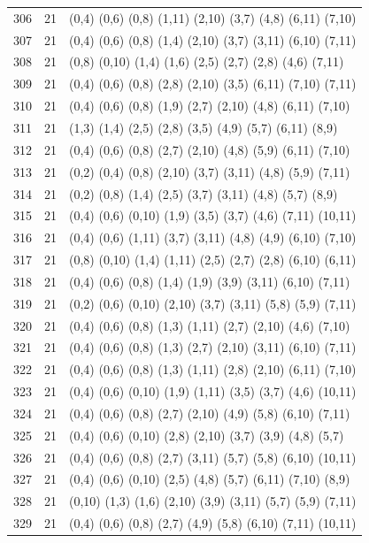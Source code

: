 {\begin{longtable}{lll}
306 & 21 & (0,4) (0,6) (0,8) (1,11) (2,10) (3,7) (4,8) (6,11) (7,10) \\
307 & 21 & (0,4) (0,6) (0,8) (1,4) (2,10) (3,7) (3,11) (6,10) (7,11) \\
308 & 21 & (0,8) (0,10) (1,4) (1,6) (2,5) (2,7) (2,8) (4,6) (7,11) \\
309 & 21 & (0,4) (0,6) (0,8) (2,8) (2,10) (3,5) (6,11) (7,10) (7,11) \\
310 & 21 & (0,4) (0,6) (0,8) (1,9) (2,7) (2,10) (4,8) (6,11) (7,10) \\
311 & 21 & (1,3) (1,4) (2,5) (2,8) (3,5) (4,9) (5,7) (6,11) (8,9) \\
312 & 21 & (0,4) (0,6) (0,8) (2,7) (2,10) (4,8) (5,9) (6,11) (7,10) \\
313 & 21 & (0,2) (0,4) (0,8) (2,10) (3,7) (3,11) (4,8) (5,9) (7,11) \\
314 & 21 & (0,2) (0,8) (1,4) (2,5) (3,7) (3,11) (4,8) (5,7) (8,9) \\
315 & 21 & (0,4) (0,6) (0,10) (1,9) (3,5) (3,7) (4,6) (7,11) (10,11) \\
316 & 21 & (0,4) (0,6) (1,11) (3,7) (3,11) (4,8) (4,9) (6,10) (7,10) \\
317 & 21 & (0,8) (0,10) (1,4) (1,11) (2,5) (2,7) (2,8) (6,10) (6,11) \\
318 & 21 & (0,4) (0,6) (0,8) (1,4) (1,9) (3,9) (3,11) (6,10) (7,11) \\
319 & 21 & (0,2) (0,6) (0,10) (2,10) (3,7) (3,11) (5,8) (5,9) (7,11) \\
320 & 21 & (0,4) (0,6) (0,8) (1,3) (1,11) (2,7) (2,10) (4,6) (7,10) \\
321 & 21 & (0,4) (0,6) (0,8) (1,3) (2,7) (2,10) (3,11) (6,10) (7,11) \\
322 & 21 & (0,4) (0,6) (0,8) (1,3) (1,11) (2,8) (2,10) (6,11) (7,10) \\
323 & 21 & (0,4) (0,6) (0,10) (1,9) (1,11) (3,5) (3,7) (4,6) (10,11) \\
324 & 21 & (0,4) (0,6) (0,8) (2,7) (2,10) (4,9) (5,8) (6,10) (7,11) \\
325 & 21 & (0,4) (0,6) (0,10) (2,8) (2,10) (3,7) (3,9) (4,8) (5,7) \\
326 & 21 & (0,4) (0,6) (0,8) (2,7) (3,11) (5,7) (5,8) (6,10) (10,11) \\
327 & 21 & (0,4) (0,6) (0,10) (2,5) (4,8) (5,7) (6,11) (7,10) (8,9) \\
328 & 21 & (0,10) (1,3) (1,6) (2,10) (3,9) (3,11) (5,7) (5,9) (7,11) \\
329 & 21 & (0,4) (0,6) (0,8) (2,7) (4,9) (5,8) (6,10) (7,11) (10,11) \\

\end{longtable}}
